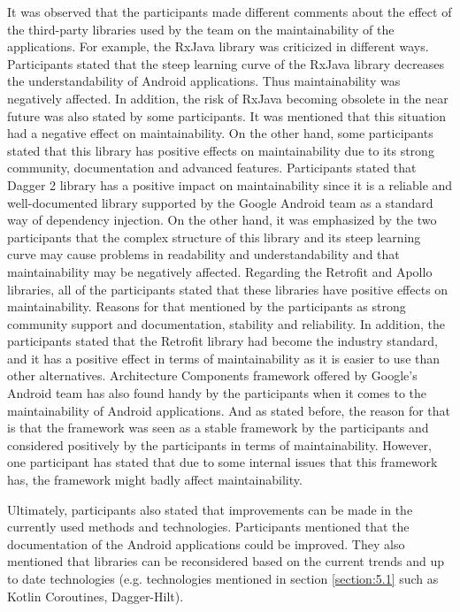 It was observed that the participants made different comments about the effect of the third-party libraries used by the team on the maintainability of the applications. For example, the RxJava library was criticized in different ways. Participants stated that the steep learning curve of the RxJava library decreases the understandability of Android applications. Thus maintainability was negatively affected. In addition, the risk of RxJava becoming obsolete in the near future was also stated by some participants. It was mentioned that this situation had a negative effect on maintainability. On the other hand, some participants stated that this library has positive effects on maintainability due to its strong community, documentation and advanced features. Participants stated that Dagger 2 library has a positive impact on maintainability since it is a reliable and well-documented library supported by the Google Android team as a standard way of dependency injection. On the other hand, it was emphasized by the two participants that the complex structure of this library and its steep learning curve may cause problems in readability and understandability and that maintainability may be negatively affected. Regarding the Retrofit and Apollo libraries, all of the participants stated that these libraries have positive effects on maintainability. Reasons for that mentioned by the participants as strong community support and documentation, stability and reliability. In addition, the participants stated that the Retrofit library had become the industry standard, and it has a positive effect in terms of maintainability as it is easier to use than other alternatives. Architecture Components framework offered by Google's Android team has also found handy by the participants when it comes to the maintainability of Android applications. And as stated before, the reason for that is that the framework was seen as a stable framework by the participants and considered positively by the participants in terms of maintainability. However, one participant has stated that due to some internal issues that this framework has, the framework might badly affect maintainability. 

Ultimately, participants also stated that improvements can be made in the currently used methods and technologies. Participants mentioned that the documentation of the Android applications could be improved. They also mentioned that libraries can be reconsidered based on the current trends and up to date technologies (e.g. technologies mentioned in section \ref{section:5.1} such as Kotlin Coroutines, Dagger-Hilt).